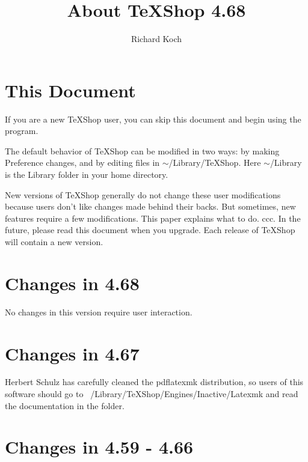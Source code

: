 \documentclass[11pt, oneside]{amsart}
\title{About TeXShop 4.68}
\author{Richard Koch}
\begin{document}
\maketitle

\thispagestyle{empty}
\vspace{-.3in}
\section{This Document}

If you are a new TeXShop user, you can skip this document and begin using the program.

The default behavior of TeXShop can be modified in two ways: by making Preference changes, and by editing files in $\sim$/Library/TeXShop. Here $\sim$/Library is the Library folder in your home directory. 

New versions of TeXShop generally do not change these user modifications because users don't like changes made behind their backs. But sometimes, new features require a few modifications. This paper explains what to do.
ccc.
In the future, please read this document when you upgrade. Each release of TeXShop will contain a new version.

\section{Changes in 4.68}

No changes in this version require user interaction.  


\section{Changes in 4.67}

Herbert Schulz has carefully cleaned the pdflatexmk distribution, so users of this software should go to ~/Library/TeXShop/Engines/Inactive/Latexmk and read the documentation in the folder.

\section{Changes in 4.59 - 4.66}
\end{document}
